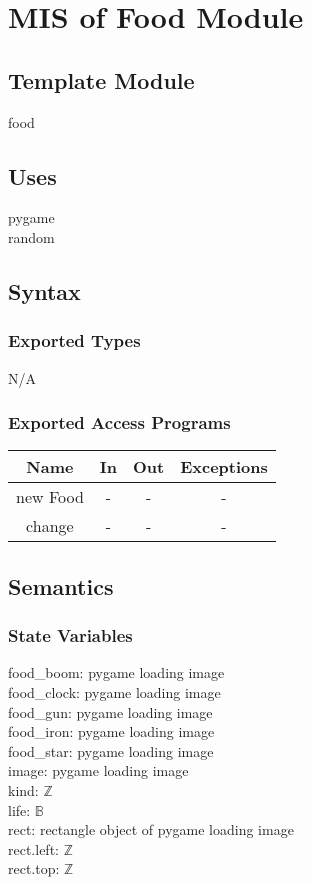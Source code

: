 \documentclass[12pt, titlepage]{article}
\begin{document}
\section{MIS of Food Module}
        \subsection{Template Module}
        food
        \subsection{Uses}
        pygame\\
        random
		\subsection{Syntax}
		\subsubsection{Exported Types}
		N/A
		\subsubsection{Exported Access Programs}
		\begin{table}[!htbp]
				\begin{tabular}{|c|c|c|c|}
					\hline
					Name & In & Out & Exceptions \\ \hline
					new Food & - & - & - \\ \hline
					change & - & - & - \\ \hline
				\end{tabular}
			\end{table}
		
		\subsection{Semantics}
		\subsubsection{State Variables}
		food\_boom: pygame loading image\\
		food\_clock: pygame loading image\\
		food\_gun: pygame loading image\\
		food\_iron: pygame loading image\\
		food\_star: pygame loading image\\
		image: pygame loading image\\
		kind: $\mathbb{Z}$\\
		life: $\mathbb{B}$\\
		rect: rectangle object of pygame loading image\\
		rect.left: $\mathbb{Z}$\\
		rect.top: $\mathbb{Z}$
\end{document}
